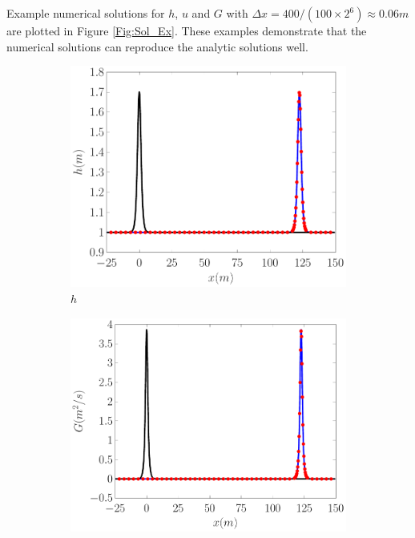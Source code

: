 \documentclass[10pt]{elsarticle}
\begin{document}
Example numerical solutions for $h$, $u$ and $G$ with $\Delta x = 400 / (100 \times 2^{6}) \approx 0.06m$ are plotted in Figure \ref{Fig:Sol_Ex}. These examples demonstrate that the numerical solutions can reproduce the analytic solutions well.
%
\begin{figure}
	\centering
	\begin{subfigure}{0.32\textwidth}
		\centering
		\includegraphics[width=\textwidth]{./Figures/Simulations/Validation/Serre/hEx.pdf}
		\caption{$h$}
	\end{subfigure}
	\begin{subfigure}{0.32\textwidth}
		\centering
		\includegraphics[width=\textwidth]{./Figures/Simulations/Validation/Serre/GEx.pdf}

\end{subfigure}
\end{figure}
\end{document}
